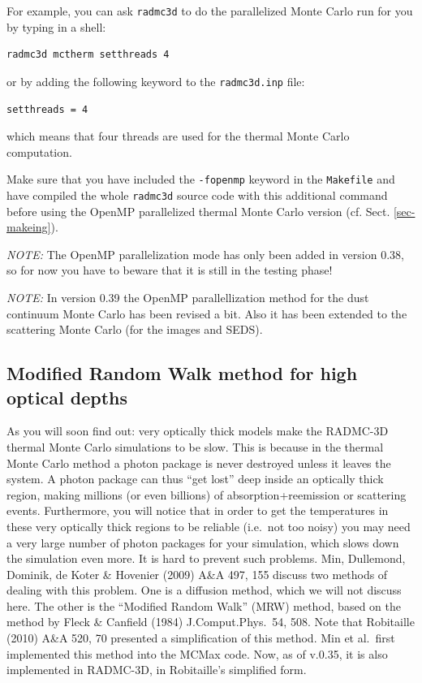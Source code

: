 \documentclass{report}
\begin{document}
For example, you can ask {\small\tt radmc3d} to do the parallelized Monte
Carlo run for you by typing in a shell:
{\small\begin{verbatim}
radmc3d mctherm setthreads 4
\end{verbatim}}

or by adding the following keyword to the {\small\tt radmc3d.inp} file:
{\small\begin{verbatim}
setthreads = 4
\end{verbatim}}

which means that four threads are used for the thermal Monte Carlo
computation.

Make sure that you have included the {\small\tt -fopenmp} keyword in the
{\small\tt Makefile} and have compiled the whole {\small\tt radmc3d} source
code with this additional command before using the OpenMP parallelized
thermal Monte Carlo version (cf. Sect. \ref{sec-makeing}).

{\em NOTE:} The OpenMP parallelization mode has only been added in version
0.38, so for now you have to beware that it is still in the testing phase!

{\em NOTE:} In version 0.39 the OpenMP parallellization method for the dust
continuum Monte Carlo has been revised a bit. Also it has been extended
to the scattering Monte Carlo (for the images and SEDS). 

\subsection{Modified Random Walk method for high optical depths}
\label{sec-modrandwalk}
%
As you will soon find out: very optically thick models make the RADMC-3D
thermal Monte Carlo simulations to be slow. This is because in the thermal
Monte Carlo method a photon package is never destroyed unless it leaves the
system. A photon package can thus ``get lost'' deep inside an optically
thick region, making millions (or even billions) of absorption+reemission or
scattering events. Furthermore, you will notice that in order to get the
temperatures in these very optically thick regions to be reliable (i.e.\ not
too noisy) you may need a very large number of photon packages for your
simulation, which slows down the simulation even more. It is hard to prevent
such problems. Min, Dullemond, Dominik, de Koter \& Hovenier (2009) A\&A
497, 155 discuss two methods of dealing with this problem. One is a
diffusion method, which we will not discuss here. The other is the
``Modified Random Walk'' (MRW) method, based on the method by Fleck \&
Canfield (1984) J.Comput.Phys.\ 54, 508. Note that Robitaille (2010) A\&A
520, 70 presented a simplification of this method. Min et al.\ first
implemented this method into the MCMax code. Now, as of v.0.35, it is also
implemented in RADMC-3D, in Robitaille's simplified form.
\end{document}
